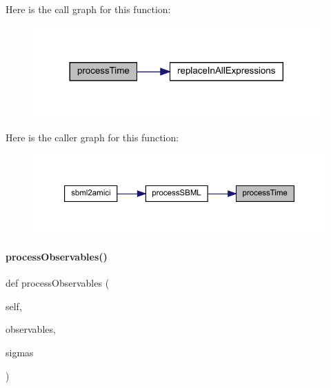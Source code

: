 Here is the call graph for this function\+:
\nopagebreak
\begin{figure}[H]
\begin{center}
\leavevmode
\includegraphics[width=312pt]{classamici_1_1sbml__import_1_1_sbml_importer_a2819c6ad1b541e49e728aa172e57208e_cgraph}
\end{center}
\end{figure}
Here is the caller graph for this function\+:
\nopagebreak
\begin{figure}[H]
\begin{center}
\leavevmode
\includegraphics[width=350pt]{classamici_1_1sbml__import_1_1_sbml_importer_a2819c6ad1b541e49e728aa172e57208e_icgraph}
\end{center}
\end{figure}
\mbox{\label{classamici_1_1sbml__import_1_1_sbml_importer_a903b87aa6c483832424fa2cc76adc4d5}} 
\paragraph{\texorpdfstring{processObservables()}{processObservables()}}
{\footnotesize\ttfamily def process\+Observables (\begin{DoxyParamCaption}\item[{}]{self,  }\item[{}]{observables,  }\item[{}]{sigmas }\end{DoxyParamCaption})}


